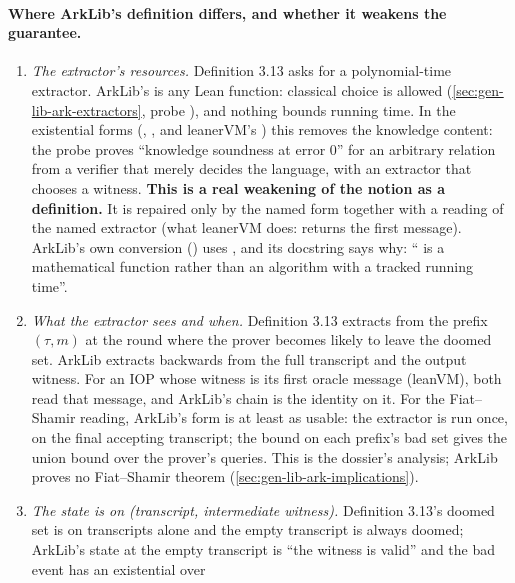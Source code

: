 \paragraph{Where ArkLib's definition differs, and whether it weakens the guarantee.}
\begin{enumerate}
\item \emph{The extractor's resources.} Definition 3.13 asks for a polynomial-time extractor.
  ArkLib's  is any Lean function: classical choice is allowed
  (\cref{sec:gen-lib-ark-extractors}, probe ), and nothing bounds running time.
  In the existential forms (, ,
  and leanerVM's \allowbreak{}\allowbreak{}) this removes the knowledge content: the
  probe proves \enquote{knowledge soundness at error 0} for an arbitrary relation from a verifier
  that merely decides the language, with an extractor that chooses a witness. \textbf{This is a
  real weakening of the notion as a definition.} It is repaired only by the named form together
  with a reading of the named extractor (what leanerVM does:  returns the
  first message). ArkLib's own conversion \allowbreak{}\allowbreak{}
  (\allowbreak{}) uses , and its docstring says why:
  \enquote{ is a mathematical function rather than an algorithm with a tracked
  running time}.
\item \emph{What the extractor sees and when.} Definition 3.13 extracts from the prefix
  $(\tau, m)$ at the round where the prover becomes likely to leave the doomed set. ArkLib
  extracts backwards from the full transcript and the output witness. For an IOP whose witness is
  its first oracle message (leanVM), both read that message, and ArkLib's chain is the identity on
  it. For the Fiat--Shamir reading, ArkLib's form is at least as usable: the extractor is run
  once, on the final accepting transcript; the bound on each prefix's bad set gives the union
  bound over the prover's queries. This is the dossier's analysis; ArkLib proves no Fiat--Shamir
  theorem (\cref{sec:gen-lib-ark-implications}).
\item \emph{The state is on (transcript, intermediate witness).} Definition 3.13's doomed set is on
  transcripts alone and the empty transcript is always doomed; ArkLib's state at the empty
  transcript is \enquote{the witness is valid} and the bad event has an existential over

\end{enumerate}
